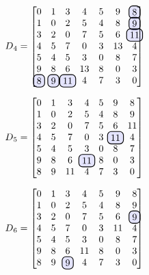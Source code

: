 \documentclass[devoir3.tex]{subfiles}
\begin{document}
\begin{align*}
	D\textsubscript{4} =
	\begin{bmatrix}
		0 		& 1 	  	& 3 		& 4 	  	  & 5		& 9	 	& \hlight{8} \\
		1 		& 0 		& 2		& 5		  & 4		& 8	 	& \hlight{9}  \\
		3	 	& 2 		& 0 		& 7	 	  & 5 	  	& 6 		& \hlight{11} \\
		4 		& 5		& 7	  	& 0 	  	  & 3	  	& 13		& 4 \\
		5  		& 4 	 	& 5 		& 3 	  	  & 0 	  	& 8 	 	& 7  \\
		9	 	& 8	 	& 6		& 13		  & 8 	  	& 0 	 	& 3   \\
		\hlight{8} 	& \hlight{9} 	& \hlight{11}	& 4 	  	  & 7 	  	& 3 	 	& 0
	\end{bmatrix}
\end{align*}

\begin{align*}
	D\textsubscript{5} =
	\begin{bmatrix}
		0 		& 1 	  	& 3 		& 4 	  	  & 5		& 9	 	& 8 \\
		1 		& 0 		& 2		& 5		  & 4		& 8	 	& 9  \\
		3	 	& 2 		& 0 		& 7	 	  & 5 	  	& 6 		& 11 \\
		4 		& 5		& 7	  	& 0 	  	  & 3	  	& \hlight{11}	& 4 \\
		5  		& 4 	 	& 5 		& 3 	  	  & 0 	  	& 8 	 	& 7  \\
		9	 	& 8	 	& 6		& \hlight{11}	  & 8 	  	& 0 	 	& 3   \\
		8 		& 9 		& 11		& 4 	  	  & 7 	  	& 3 	 	& 0
	\end{bmatrix}
\end{align*}

\begin{align*}
	D\textsubscript{6} =
	\begin{bmatrix}
		0 		& 1 	  	& 3 		& 4 	  	  & 5		& 9	 	& 8 \\
		1 		& 0 		& 2		& 5		  & 4		& 8	 	& 9  \\
		3	 	& 2 		& 0 		& 7	 	  & 5 	  	& 6 		& \hlight{9} \\
		4 		& 5		& 7	  	& 0 	  	  & 3	  	& 11		& 4 \\
		5  		& 4 	 	& 5 		& 3 	  	  & 0 	  	& 8 	 	& 7  \\
		9	 	& 8	 	& 6		& 11		  & 8 	  	& 0 	 	& 3   \\
		8 		& 9 		& \hlight{9}	& 4 	  	  & 7 	  	& 3 	 	& 0
	\end{bmatrix}
\end{align*}
\end{document}
